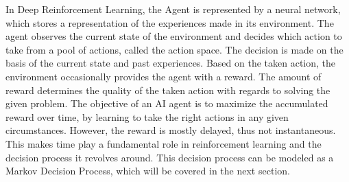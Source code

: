 \documentclass[12pt,a4paper]{article}
\begin{document}
In Deep Reinforcement Learning, the Agent is represented by a neural network, which stores a representation of the experiences made in its environment. The agent observes the current state of the environment and decides which action to take from a pool of actions, called the action space.
The decision is made on the basis of the current state and past experiences. Based on the taken action, the environment occasionally provides the agent with a reward. The amount of reward determines the quality of the taken action with regards to solving the given problem.
The objective of an AI agent is to maximize the accumulated reward over time, by learning to take the right actions in any given circumstances.
However, the reward is mostly delayed, thus not instantaneous. This makes time play a fundamental role in reinforcement learning and the decision process it revolves around.
This decision process can be modeled as a Markov Decision Process, which will be covered in the next section.
\end{document}
